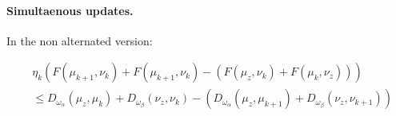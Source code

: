 \documentclass[a4paper, 10pt]{article}
\begin{document}
\paragraph{Simultaenous updates.}  In the non alternated version:

\begin{align}
    &\eta_k (F(\mu_{k+1},\nu_k) + F(\mu_{k+1},\nu_k)
    - (F(\mu_z, \nu_k) + F(\mu_k, \nu_z))) \\ 
    &\leq 
    D_{\omega_\alpha}(\mu_z, \mu_k)
    + D_{\omega_\beta}(\nu_z, \nu_k)
    - (D_{\omega_\alpha}(\mu_z, \mu_{k+1}) 
     + D_{\omega_\beta}(\nu_z, \nu_{k+1}))
\end{align}


\printbibliography
\end{document}
